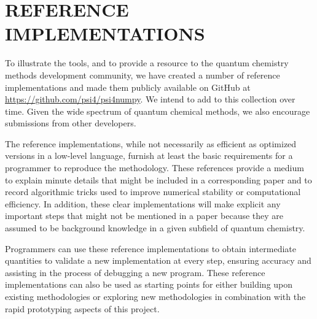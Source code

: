\documentclass[%
  class = book,%
  crop = false,%
  float = true,%
  multi = true,%
  preview = false,%
]{standalone}
\newcommand{\caps}[1]{\uppercase{#1}}
\begin{document}
\section{\texorpdfstring{\caps{Reference Implementations}}{Reference Implementations}}

To illustrate the \pfn tools, and to provide a resource to the quantum chemistry methods development community, we have created a number of reference implementations and made them publicly available on GitHub at \url{https://github.com/psi4/psi4numpy}.  We intend to add to this collection over time.  Given the wide spectrum of quantum chemical methods, we also encourage submissions from other developers.

The \pfn reference implementations, while not necessarily as efficient as optimized versions in a low-level language, furnish at least the basic requirements for a programmer to reproduce the methodology. These references provide a medium to explain minute details that might be included in a corresponding paper and to record algorithmic tricks used to improve numerical stability or computational efficiency. In addition, these clear implementations will make explicit any important steps that might not be mentioned in a paper because they are assumed to be background knowledge in a given subfield of quantum chemistry.

Programmers can use these reference implementations to obtain intermediate quantities to validate a new implementation at every step, ensuring accuracy and assisting in the process of debugging a new program. These reference implementations can also be used as starting points for either building upon existing methodologies or exploring new methodologies in combination with the rapid prototyping aspects of this project.
\end{document}

